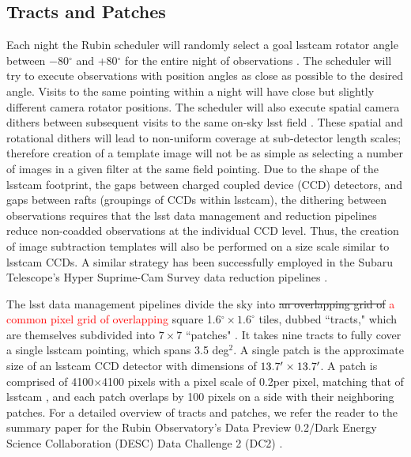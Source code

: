 \documentclass[preprintm,linenumbers]{aastex631}
\providecommand{\red}[1]{\textcolor{red}{#1}}
\begin{document}
	
	
	
	\subsection{Tracts and Patches}
	\label{sec:tractsandpatches} 
	
	Each night the Rubin scheduler will randomly select a goal \gls*{lsstcam} rotator angle between $-$80$^{\circ}$ and +80$^{\circ}$ for the entire night of observations \citep{v4.0sims}. 
 The scheduler will try to execute observations with position angles as close as possible to the desired angle. Visits to the same pointing within a night will have close but slightly different camera rotator positions. 
 The scheduler will also execute spatial camera dithers between subsequent visits to the same on-sky \gls*{lsst} field \citep{v4.0sims}. 
These spatial and rotational dithers will lead to non-uniform coverage at sub-detector length scales; therefore creation of a template image will not be as simple as selecting a number of images in a given filter at the same field pointing. 
 Due to the shape of the \gls*{lsstcam} footprint, the gaps between charged coupled device (CCD) detectors, and gaps between rafts (groupings of CCDs within \gls*{lsstcam}), the dithering between observations requires that the \gls*{lsst} data management and reduction pipelines reduce non-coadded observations at the individual CCD level. Thus, the creation of image subtraction templates will also be performed on a size scale similar to \gls*{lsstcam} CCDs.
 A similar strategy has been successfully employed in the Subaru Telescope's Hyper Suprime-Cam Survey data reduction pipelines \citep{2018PASJ...70S...5B}. 
 
	
	The \gls*{lsst} data management pipelines divide the sky into \sout{an overlapping grid of} \red{a common pixel grid of overlapping} square 1.6$^{\circ} \times 1.6^{\circ}$ tiles, dubbed ``tracts," which are themselves subdivided into $7 \times 7$ ``patches" \citep[see Figure \ref{fig:tractsandpatches} and][]{2018PASJ...70S...5B, LDM-151}. 
	It takes nine tracts to fully cover a single \gls*{lsstcam} pointing, which spans 3.5 deg$^2$. A single patch is the approximate size of an \gls*{lsstcam} CCD detector with dimensions of $13.7\mbox{$^\prime$} \times 13.7\mbox{$^\prime$}$. A patch is comprised of 4100$\times$4100 pixels with a pixel scale of 0.2\arcsec per pixel, matching that of \gls*{lsstcam} \citep{2019ApJ...873..111I,LDM-151}, and each patch overlaps by 100 pixels on a side with their neighboring patches.  For a detailed overview of tracts and patches, we refer the reader to the summary paper for the Rubin Observatory's Data Preview 0.2/Dark Energy Science Collaboration (DESC) Data Challenge 2 (DC2) \citep{2021ApJS..253...31L}.  
	
\end{document}
